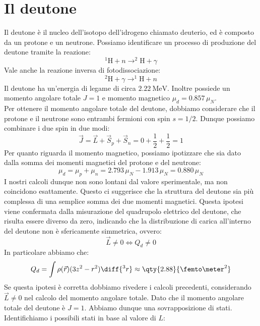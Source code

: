 \section{Il deutone}
Il deutone è il nucleo dell'isotopo dell'idrogeno chiamato deuterio, ed è composto da un protone e un neutrone. Possiamo identificare un processo di produzione del deutone tramite la reazione:
\begin{equation}
 ^1\text{H} + n \rightarrow ^2\text{H} + \gamma
\end{equation}
Vale anche la reazione inversa di fotodissociazione:
\begin{equation}
 ^2\text{H} + \gamma \rightarrow ^1\text{H} + n
\end{equation}
Il deutone ha un'energia di legame di circa $\qty{2.22}{\mega\electronvolt}$. Inoltre possiede un momento angolare totale $J=1$ e momento magnetico $\mu_d = 0.857 \,\mu_N$.\\
Per ottenere il momento angolare totale del deutone, dobbiamo considerare che il protone e il neutrone sono entrambi fermioni con spin $s=1/2$. Dunque possiamo combinare i due spin in due modi:
\begin{equation}
  \vec{J} = \vec{L} + \vec{S}_p + \vec{S}_n = 0 + \dfrac{1}{2} + \dfrac{1}{2} = 1
\end{equation}
Per quanto riguarda il momento magnetico, possiamo ipotizzare che sia dato dalla somma dei momenti magnetici del protone e del neutrone:
\begin{equation}
 \mu_d = \mu_p + \mu_n = 2.793\,\mu_N - 1.913\,\mu_N = 0.880\,\mu_N
\end{equation}
I nostri calcoli dunque non sono lontani dal valore sperimentale, ma non coincidono esattamente. Questo ci suggerisce che la struttura del deutone sia più complessa di una semplice somma dei due momenti magnetici. Questa ipotesi viene confermata dalla misurazione del quadrupolo elettrico del deutone, che risulta essere diverso da zero, indicando che la distribuzione di carica all'interno del deutone non è sfericamente simmetrica, ovvero:
\begin{equation}
  \vec{L} \neq 0 \iff Q_d \neq 0
\end{equation}
In particolare abbiamo che:
\begin{equation}
 Q_d = \int \rho(\vec{r}) (3z^2 - r^2) \diff{^3 r} \approx \qty{2.88}{\femto\meter^2}
\end{equation}
Se questa ipotesi è corretta dobbiamo rivedere i calcoli precedenti, considerando $\vec{L} \neq 0$ nel calcolo del momento angolare totale. Dato che il momento angolare totale del deutone è $J=1$. Abbiamo dunque una sovrapposizione di stati. Identifichiamo i possibili stati in base al valore di $L$:
